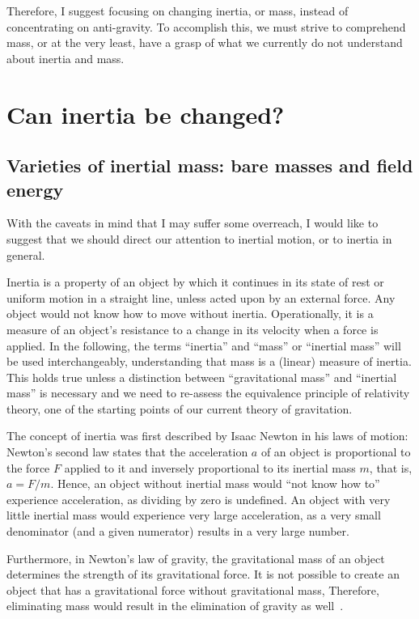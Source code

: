 Therefore, I suggest focusing on changing inertia, or mass, instead of concentrating on anti-gravity. To accomplish this, we must strive to comprehend mass, or at the very least, have a grasp of what we currently do not understand about inertia and mass.


\section{Can inertia be changed?}
\label{2023-UFO-part-Perception-flight-characteristics-ci}


\subsection{Varieties of inertial mass: bare masses and field energy}

With the caveats in mind that I may suffer some overreach, I would like to suggest that
we should direct our attention to inertial motion, or to inertia in general.

Inertia is a property of an object by which it continues in its state of rest or uniform motion in a straight line,
unless acted upon by an external force. Any object would not know how to move without inertia. Operationally, it is a measure of an object's resistance to a change in its velocity when a force is applied. In the following, the terms ``inertia'' and ``mass'' or ``inertial mass'' will be used interchangeably, understanding that mass is a
(linear) measure of inertia. This holds true unless a distinction between ``gravitational mass'' and ``inertial mass'' is necessary
and we need to re-assess the equivalence principle of relativity theory, one of the starting points of our current theory of gravitation.


The concept of inertia was first described by Isaac Newton in his laws of motion:
Newton's second law states that the acceleration $a$ of an object is proportional to the force $F$
applied to it and inversely proportional to its inertial mass $m$, that is, $a = F / m$.
Hence, an object without inertial mass would ``not know how to'' experience acceleration, as dividing by zero is undefined.
An object with very little inertial mass would experience very large acceleration, as a very small denominator (and a
given numerator) results in a very large number.

Furthermore, in Newton's law of gravity, the gravitational mass of an object determines the strength of its gravitational force.
It is not possible to create an object that has a gravitational force without gravitational mass,
Therefore, eliminating mass would result in the elimination of gravity as well~\cite{Wilczek2003}.

